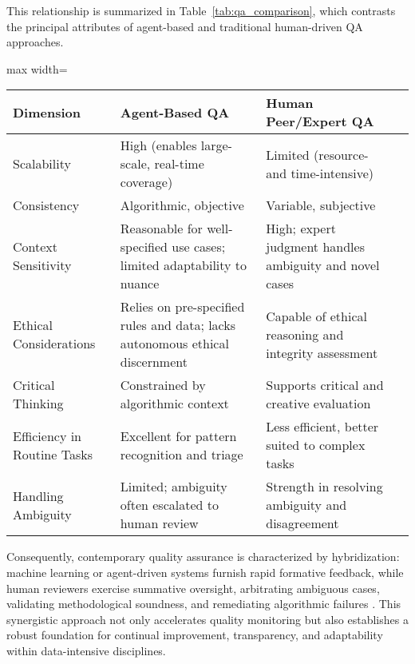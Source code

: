 This relationship is summarized in Table~\ref{tab:qa_comparison}, which contrasts the principal attributes of agent-based and traditional human-driven QA approaches.

\begin{table*}[htbp]
\centering
\caption{Comparison of Agent-Based and Human-Driven Quality Assurance Approaches}
\label{tab:qa_comparison}
\begin{adjustbox}{max width=\textwidth}
\begin{tabular}{@{}llll@{}}
\toprule
Dimension & Agent-Based QA & Human Peer/Expert QA &  \\
\midrule
Scalability & High (enables large-scale, real-time coverage) & Limited (resource- and time-intensive) &  \\
Consistency & Algorithmic, objective & Variable, subjective &  \\
Context Sensitivity & Reasonable for well-specified use cases; limited adaptability to nuance & High; expert judgment handles ambiguity and novel cases &  \\
Ethical Considerations & Relies on pre-specified rules and data; lacks autonomous ethical discernment & Capable of ethical reasoning and integrity assessment &  \\
Critical Thinking & Constrained by algorithmic context & Supports critical and creative evaluation &  \\
Efficiency in Routine Tasks & Excellent for pattern recognition and triage & Less efficient, better suited to complex tasks &  \\
Handling Ambiguity & Limited; ambiguity often escalated to human review & Strength in resolving ambiguity and disagreement &  \\
\bottomrule
\end{tabular}
\end{adjustbox}
\end{table*}

Consequently, contemporary quality assurance is characterized by hybridization: machine learning or agent-driven systems furnish rapid formative feedback, while human reviewers exercise summative oversight, arbitrating ambiguous cases, validating methodological soundness, and remediating algorithmic failures \cite{ref88}\cite{ref89}\cite{ref91}\cite{ref92}\cite{ref96}\cite{ref98}\cite{ref108}. This synergistic approach not only accelerates quality monitoring but also establishes a robust foundation for continual improvement, transparency, and adaptability within data-intensive disciplines.

